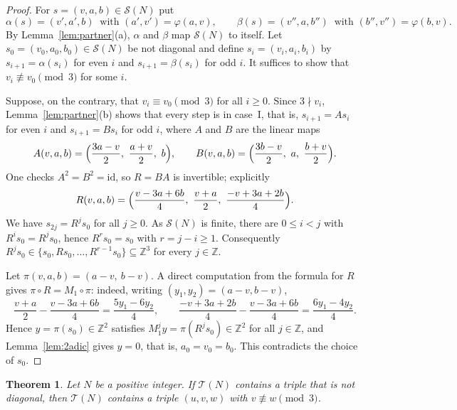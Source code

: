 \documentclass[11pt]{amsart}
\newtheorem{theorem}{Theorem}[section]
\theoremstyle{definition}
\theoremstyle{remark}
\newcommand{\Z}{\mathbb{Z}}
\newcommand{\cS}{\mathcal{S}}
\newcommand{\cT}{\mathcal{T}}
\begin{document}
\begin{proof}
For $s=(v,a,b)\in\cS(N)$ put
\[
\alpha(s)=(v',a',b)\ \text{ with } (a',v')=\varphi(a,v),\qquad
\beta(s)=(v'',a,b'')\ \text{ with } (b'',v'')=\varphi(b,v).
\]
By Lemma~\ref{lem:partner}(a), $\alpha$ and $\beta$ map $\cS(N)$ to itself.
Let $s_0=(v_0,a_0,b_0)\in\cS(N)$ be not diagonal and define $s_i=(v_i,a_i,b_i)$ by
$s_{i+1}=\alpha(s_i)$ for even $i$ and $s_{i+1}=\beta(s_i)$ for odd $i$.
It suffices to show that $v_i\not\equiv v_0\pmod 3$ for some $i$.

Suppose, on the contrary, that $v_i\equiv v_0\pmod 3$ for all $i\ge 0$.
Since $3\nmid v_i$, Lemma~\ref{lem:partner}(b) shows that every step is in case~I, that is, $s_{i+1}=As_i$ for even $i$ and $s_{i+1}=Bs_i$ for odd $i$,
where $A$ and $B$ are the linear maps
\[
A(v,a,b)=\Bigl(\frac{3a-v}{2},\ \frac{a+v}{2},\ b\Bigr),\qquad
B(v,a,b)=\Bigl(\frac{3b-v}{2},\ a,\ \frac{b+v}{2}\Bigr).
\]
One checks $A^2=B^2=\mathrm{id}$, so $R=BA$ is invertible; explicitly
\[
R(v,a,b)=\Bigl(\frac{v-3a+6b}{4},\ \frac{v+a}{2},\ \frac{-v+3a+2b}{4}\Bigr).
\]
We have $s_{2j}=R^js_0$ for all $j\ge 0$. As $\cS(N)$ is finite, there are $0\le i<j$ with $R^is_0=R^js_0$,
hence $R^rs_0=s_0$ with $r=j-i\ge 1$.
Consequently $R^js_0\in\{s_0,Rs_0,\dots,R^{r-1}s_0\}\subseteq\Z^3$ for every $j\in\Z$.

Let $\pi(v,a,b)=(a-v,\ b-v)$. A direct computation from the formula for $R$ gives $\pi\circ R=M_1\circ\pi$:
indeed, writing $(y_1,y_2)=(a-v,b-v)$,
\[
\frac{v+a}{2}-\frac{v-3a+6b}{4}=\frac{5y_1-6y_2}{4},\qquad
\frac{-v+3a+2b}{4}-\frac{v-3a+6b}{4}=\frac{6y_1-4y_2}{4}.
\]
Hence $y=\pi(s_0)\in\Z^2$ satisfies $M_1^jy=\pi(R^js_0)\in\Z^2$ for all $j\in\Z$, and Lemma~\ref{lem:2adic} gives $y=0$,
that is, $a_0=v_0=b_0$. This contradicts the choice of $s_0$.
\end{proof}

\begin{theorem}\label{thm:B}
Let $N$ be a positive integer. If $\cT(N)$ contains a triple that is not diagonal,
then $\cT(N)$ contains a triple $(u,v,w)$ with $v\not\equiv w\pmod 3$.
\end{theorem}
\end{document}
